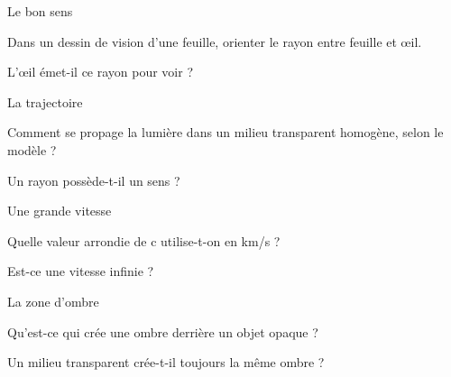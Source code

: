 \par\noindent\begin{minipage}{\linewidth}
\begin{exercice}[1]{Le bon sens}
\begin{questions}
\item Dans un dessin de vision d’une feuille, orienter le rayon entre feuille et œil.
\item L’œil émet-il ce rayon pour voir ?
\end{questions}
\end{exercice}
\end{minipage}
\par\noindent\begin{minipage}{\linewidth}
\begin{exercice}[1]{La trajectoire}
\begin{questions}
\item Comment se propage la lumière dans un milieu transparent homogène, selon le modèle ?
\item Un rayon possède-t-il un sens ?
\end{questions}
\end{exercice}
\end{minipage}
\par\noindent\begin{minipage}{\linewidth}
\begin{exercice}[1]{Une grande vitesse}
\begin{questions}
\item Quelle valeur arrondie de c utilise-t-on en km/s ?
\item Est-ce une vitesse infinie ?
\end{questions}
\end{exercice}
\end{minipage}
\par\noindent\begin{minipage}{\linewidth}
\begin{exercice}[1]{La zone d’ombre}
\begin{questions}
\item Qu’est-ce qui crée une ombre derrière un objet opaque ?
\item Un milieu transparent crée-t-il toujours la même ombre ?
\end{questions}
\end{exercice}
\end{minipage}
\clearpage{}
